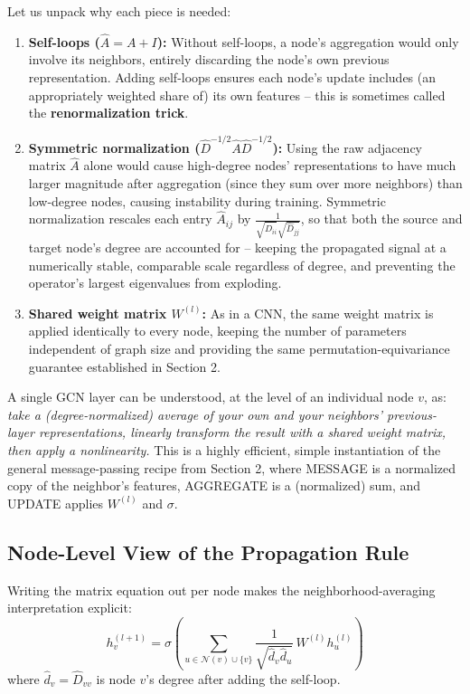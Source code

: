 \documentclass[12pt,a4paper]{article}
\begin{document}
Let us unpack why each piece is needed:

\begin{enumerate}[leftmargin=1.5em]
    \item \textbf{Self-loops ($\hat{A} = A+I$):} Without self-loops, a node's aggregation would only involve its neighbors, entirely discarding the node's own previous representation. Adding self-loops ensures each node's update includes (an appropriately weighted share of) its own features -- this is sometimes called the \textbf{renormalization trick}.
    \item \textbf{Symmetric normalization ($\hat{D}^{-1/2}\hat{A}\hat{D}^{-1/2}$):} Using the raw adjacency matrix $\hat{A}$ alone would cause high-degree nodes' representations to have much larger magnitude after aggregation (since they sum over more neighbors) than low-degree nodes, causing instability during training. Symmetric normalization rescales each entry $\hat{A}_{ij}$ by $\frac{1}{\sqrt{\hat{D}_{ii}}\sqrt{\hat{D}_{jj}}}$, so that both the source and target node's degree are accounted for -- keeping the propagated signal at a numerically stable, comparable scale regardless of degree, and preventing the operator's largest eigenvalues from exploding.
    \item \textbf{Shared weight matrix $W^{(l)}$:} As in a CNN, the same weight matrix is applied identically to every node, keeping the number of parameters independent of graph size and providing the same permutation-equivariance guarantee established in Section 2.
\end{enumerate}

\begin{keyidea}
A single GCN layer can be understood, at the level of an individual node $v$, as: \emph{take a (degree-normalized) average of your own and your neighbors' previous-layer representations, linearly transform the result with a shared weight matrix, then apply a nonlinearity.} This is a highly efficient, simple instantiation of the general message-passing recipe from Section 2, where MESSAGE is a normalized copy of the neighbor's features, AGGREGATE is a (normalized) sum, and UPDATE applies $W^{(l)}$ and $\sigma$.
\end{keyidea}

\subsection{Node-Level View of the Propagation Rule}

Writing the matrix equation out per node makes the neighborhood-averaging interpretation explicit:
\[
h_v^{(l+1)} = \sigma\left(\sum_{u \in \mathcal{N}(v) \cup \{v\}} \frac{1}{\sqrt{\hat{d}_v \hat{d}_u}}\, W^{(l)} h_u^{(l)}\right)
\]
where $\hat{d}_v = \hat{D}_{vv}$ is node $v$'s degree after adding the self-loop.
\end{document}

